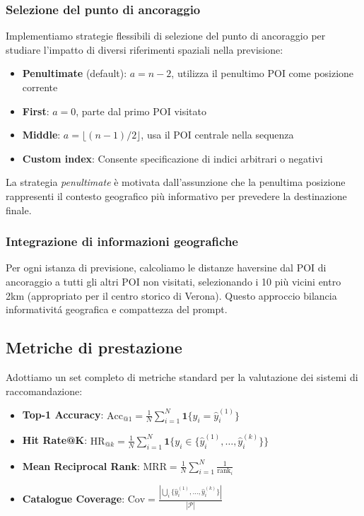 \subsubsection{Selezione del punto di ancoraggio}\label{sec:anchor}

Implementiamo strategie flessibili di selezione del punto di ancoraggio per studiare l'impatto di diversi riferimenti spaziali nella previsione:

\begin{itemize}
\item \textbf{Penultimate} (default): $a = n-2$, utilizza il penultimo POI come posizione corrente
\item \textbf{First}: $a = 0$, parte dal primo POI visitato 
\item \textbf{Middle}: $a = \lfloor (n-1)/2 \rfloor$, usa il POI centrale nella sequenza
\item \textbf{Custom index}: Consente specificazione di indici arbitrari o negativi
\end{itemize}

La strategia \textit{penultimate} è motivata dall'assunzione che la penultima posizione rappresenti il contesto geografico più informativo per prevedere la destinazione finale.

\subsubsection{Integrazione di informazioni geografiche}

Per ogni istanza di previsione, calcoliamo le distanze haversine dal POI di ancoraggio a tutti gli altri POI non visitati, selezionando i 10 più vicini entro 2km (appropriato per il centro storico di Verona). Questo approccio bilancia informativitá geografica e compattezza del prompt.

\subsection{Metriche di prestazione}

Adottiamo un set completo di metriche standard per la valutazione dei sistemi di raccomandazione:

\begin{itemize}
\item \textbf{Top-1 Accuracy}: $\text{Acc}_{@1} = \frac{1}{N}\sum_{i=1}^{N}\mathbf{1}\{y_i = \hat{y}_i^{(1)}\}$
\item \textbf{Hit Rate@K}: $\text{HR}_{@k} = \frac{1}{N}\sum_{i=1}^{N}\mathbf{1}\{y_i \in \{\hat{y}_i^{(1)}, \ldots, \hat{y}_i^{(k)}\}\}$
\item \textbf{Mean Reciprocal Rank}: $\text{MRR} = \frac{1}{N}\sum_{i=1}^{N}\frac{1}{\text{rank}_i}$
\item \textbf{Catalogue Coverage}: $\text{Cov} = \frac{|\bigcup_i \{\hat{y}_i^{(1)}, \ldots, \hat{y}_i^{(k)}\}|}{|\mathcal{P}|}$
\end{itemize}

